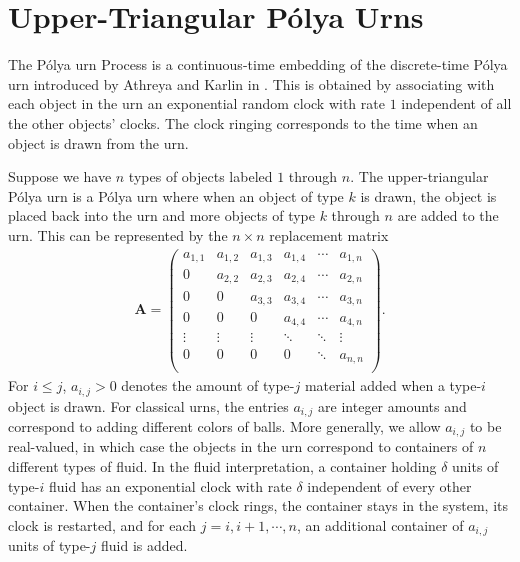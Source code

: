 \documentclass[11pt]{article}
\newenvironment{changemargin}[2]{%
\begin{list}{}{%
\setlength{\topsep}{0pt}%
\setlength{\leftmargin}{#1}%
\setlength{\rightmargin}{#2}%
\setlength{\listparindent}{\parindent}%
\setlength{\itemindent}{\parindent}%
\setlength{\parsep}{\parskip}%
}%
\item[]}{\end{list}}
\begin{document}
\begin{changemargin}{-0.5cm}{-0.5cm}
\section*{Upper-Triangular P\'{o}lya Urns}
The P\'{o}lya urn Process is a continuous-time embedding of the discrete-time P\'{o}lya urn introduced by Athreya and Karlin in \cite{AthreyaKarlin1968}. This is obtained by associating with each object in the urn an exponential random clock with rate $1$ independent of all the other objects' clocks. The clock ringing corresponds to the time when an object is drawn from the urn.

Suppose we have $n$ types of objects labeled $1$ through $n$. The upper-triangular P\'{o}lya urn is a P\'{o}lya urn where when an object of type $k$ is drawn, the object is placed back into the urn and more objects of type $k$ through $n$ are added to the urn. This can be represented by the $n \times n$ replacement matrix
\begin{align*}
    \mathbf{A} = \left(
  \begin{array}{cccccc}
    a_{1,1} & a_{1,2} & a_{1,3} & a_{1,4} & \cdots & a_{1,n} \\
    0 & a_{2,2} & a_{2,3} & a_{2,4} & \cdots & a_{2,n} \\
    0 & 0 & a_{3,3} & a_{3,4} & \cdots & a_{3,n} \\
    0 & 0 & 0 & a_{4,4} & \cdots & a_{4,n} \\
    \vdots & \vdots & \vdots & \ddots & \ddots & \vdots \\
    0 & 0 & 0 & 0 & \ddots & a_{n,n} \\
  \end{array}
\right).
\end{align*}
For $i \le j$, $a_{i,j} > 0$ denotes the amount of type-$j$ material added when a type-$i$ object is drawn. For classical urns, the entries $a_{i,j}$ are integer amounts and correspond to adding different colors of balls. More generally, we allow $a_{i,j}$ to be real-valued, in which case the objects in the urn correspond to containers of $n$ different types of fluid. In the fluid interpretation, a container holding $\delta$ units of type-$i$ fluid has an exponential clock with rate $\delta$ independent of every other container. When the container's clock rings, the container stays in the system, its clock is restarted, and for each $j=i,i+1, \cdots, n$, an additional container of $a_{i,j}$ units of type-$j$ fluid is added.


\end{changemargin}
\end{document}
